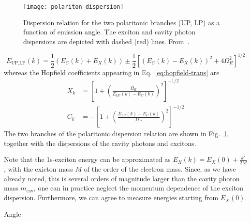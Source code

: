 %
\begin{figure}[tb]\centering
  \texttt{[image: polariton\_dispersion]}
  \caption{
    Dispersion relation for the two polaritonic branches (UP, LP) as a function of emission angle. The exciton and cavity photon dispersions are depicted with dashed (red) lines. From~\cite{Keeling_2007}.
  }\label{fig:polariton-dispersion}
\end{figure}
% 
\begin{equation}\label{eq:polariton-dispersion}
  E_{\text{UP,LP}}(k) = \frac{1}{2}\left(E_C(k) + E_X(k)\right) \pm \frac{1}{2}\left[\left(E_C(k) - E_X(k)\right)^2 + 4 \Omega_R^2\right]^{1/2}
\end{equation}
% 
whereas the Hopfield coefficients appearing in Eq.~\eqref{eq:hopfield-trans} are
\begin{align}
  X_k & =\left[1 + \left(\frac{\Omega_R}{E_{\text{LP}}(k) - E_C(k)}\right)^2\right]^{-1/2}\label{eq:hopfield-X}\\
  C_k & =-\left[1 + \left(\frac{E_{\text{LP}}(k) - E_C(k)}{\Omega_R}\right)^2\right]^{-1/2}
\end{align}
The two branches of the polaritonic dispersion relation are shown in
Fig.~\ref{fig:polariton-dispersion}, together with the dispersions of
the cavity photons and excitons.

Note that the 1s-exciton energy can be approximated as
$E_X(k) = E_X(0) + \frac{k^2}{2M}$, with the exicton mass $M$ of the
order of the electron mass. Since, as we have already noted, this is
several orders of magnitude larger than the cavity photon mass
$m_{\text{cav}}$, one can in practice neglect the momentum dependence
of the exciton dispersion. Furthermore, we can agree to measure
energies starting from $E_X(0)$.

Angle









